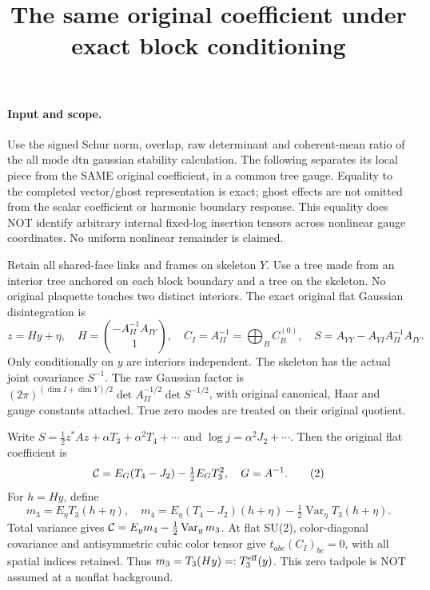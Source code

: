 \documentclass[11pt]{article}
\title{The same original coefficient under exact block conditioning}\author{}\date{}
\begin{document}
\maketitle
\paragraph{Input and scope.}
Use the signed Schur norm, overlap, raw determinant
and coherent-mean ratio of the all mode dtn gaussian stability calculation. The following separates its local
piece from the SAME original coefficient, in a common tree gauge.
Equality to the completed vector/ghost representation is exact;
ghost effects are not omitted from the scalar coefficient or harmonic
boundary response. This equality does NOT identify arbitrary internal
fixed-log insertion tensors across nonlinear gauge coordinates.
No uniform nonlinear remainder is claimed.

Retain all shared-face links and frames on skeleton $Y$. Use a tree
made from an interior tree anchored on each block boundary and a tree
on the skeleton. No original plaquette touches two distinct interiors.
The exact original flat Gaussian disintegration is
\[
 z=Hy+\eta,\quad H=\binom{-A_{II}^{-1}A_{IY}}1,\quad
 C_I=A_{II}^{-1}=\bigoplus_B C_B^{(0)},\quad
 S=A_{YY}-A_{YI}A_{II}^{-1}A_{IY}. \tag{1}
\]
Only conditionally on $y$ are interiors independent. The skeleton
has the actual joint covariance $S^{-1}$. The raw Gaussian factor is
$(2\pi)^{(\dim I+\dim Y)/2}\det A_{II}^{-1/2}\det S^{-1/2}$,
with original canonical, Haar and gauge constants attached.
True zero modes are treated on their original quotient.

Write $S=\frac12z^*Az+\alpha T_3+\alpha^2T_4+\cdots$ and
$\log j=\alpha^2J_2+\cdots$. Then the original flat coefficient is
\[
 {\cal C}=E_G(T_4-J_2)-\tfrac12E_GT_3^2,\quad G=A^{-1}. \tag{2}
\]
For $h=Hy$, define
\[
 m_3=E_\eta T_3(h+\eta),\quad
 m_4=E_\eta(T_4-J_2)(h+\eta)
                   -\tfrac12\operatorname{Var}_\eta T_3(h+\eta).
\]
Total variance gives ${\cal C}=E_y m_4-\frac12\operatorname{Var}_y m_3$.
At flat SU(2), color-diagonal covariance and antisymmetric cubic color
tensor give $t_{abc}(C_I)_{bc}=0$, with all spatial indices retained.
Thus $m_3=T_3(Hy)=:T_3^{\rm eff}(y)$. This zero tadpole is NOT assumed
at a nonflat background.
\end{document}
